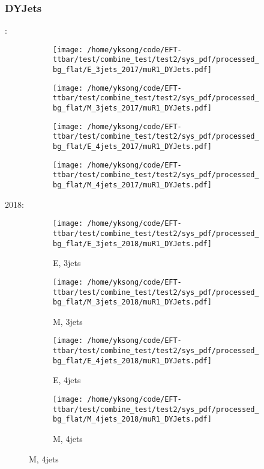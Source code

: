 \documentclass{beamer}
\begin{document}
\begin{frame}
\frametitle{DYJets}
\fontsize{5}{1}:
\begin{figure}
\centering
\begin{subfigure}[b]{0.24\textwidth}
\texttt{[image: /home/yksong/code/EFT-ttbar/test/combine\_test/test2/sys\_pdf/processed\_bg\_flat/E\_3jets\_2017/muR1\_DYJets.pdf]}
\end{subfigure}
\begin{subfigure}[b]{0.24\textwidth}
\texttt{[image: /home/yksong/code/EFT-ttbar/test/combine\_test/test2/sys\_pdf/processed\_bg\_flat/M\_3jets\_2017/muR1\_DYJets.pdf]}
\end{subfigure}
\begin{subfigure}[b]{0.24\textwidth}
\texttt{[image: /home/yksong/code/EFT-ttbar/test/combine\_test/test2/sys\_pdf/processed\_bg\_flat/E\_4jets\_2017/muR1\_DYJets.pdf]}
\end{subfigure}
\begin{subfigure}[b]{0.24\textwidth}
\texttt{[image: /home/yksong/code/EFT-ttbar/test/combine\_test/test2/sys\_pdf/processed\_bg\_flat/M\_4jets\_2017/muR1\_DYJets.pdf]}
\end{subfigure}
\end{figure}
2018:
\begin{figure}
\centering
\begin{subfigure}[b]{0.24\textwidth}
\texttt{[image: /home/yksong/code/EFT-ttbar/test/combine\_test/test2/sys\_pdf/processed\_bg\_flat/E\_3jets\_2018/muR1\_DYJets.pdf]}
\captionsetup{font=tiny}
\caption{E, 3jets}
\end{subfigure}
\begin{subfigure}[b]{0.24\textwidth}
\texttt{[image: /home/yksong/code/EFT-ttbar/test/combine\_test/test2/sys\_pdf/processed\_bg\_flat/M\_3jets\_2018/muR1\_DYJets.pdf]}
\captionsetup{font=tiny}
\caption{M, 3jets}
\end{subfigure}
\begin{subfigure}[b]{0.24\textwidth}
\texttt{[image: /home/yksong/code/EFT-ttbar/test/combine\_test/test2/sys\_pdf/processed\_bg\_flat/E\_4jets\_2018/muR1\_DYJets.pdf]}
\captionsetup{font=tiny}
\caption{E, 4jets}
\end{subfigure}
\begin{subfigure}[b]{0.24\textwidth}
\texttt{[image: /home/yksong/code/EFT-ttbar/test/combine\_test/test2/sys\_pdf/processed\_bg\_flat/M\_4jets\_2018/muR1\_DYJets.pdf]}
\captionsetup{font=tiny}
\caption{M, 4jets}
\end{subfigure}
\end{figure}
\end{frame}
\end{document}
